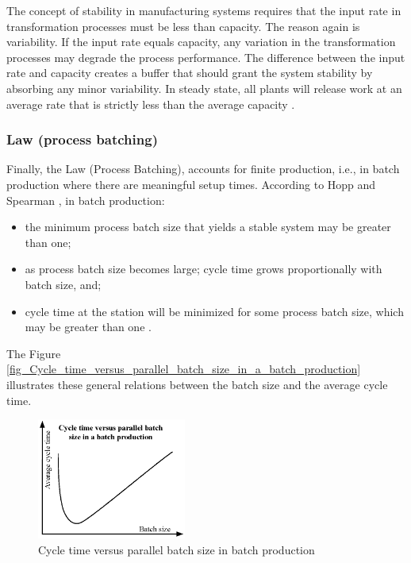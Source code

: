 \documentclass{article}
\begin{document}
The concept of stability in manufacturing systems requires that the input rate in transformation processes must be less than capacity.
The reason again is variability.
If the input rate equals capacity, any variation in the transformation processes may degrade the process performance.
The difference between the input rate and capacity creates a buffer that should grant the system stability by absorbing any minor variability.
In steady state, all plants will release work at an average rate that is strictly less than the average capacity \citep{Hopp2001}.

\subsubsection{Law (process batching)}
\label{sec:org65cbaca}

Finally, the Law (Process Batching), accounts for finite production, i.e., in batch production where there are meaningful setup times.
According to Hopp and Spearman \cite{Hopp2001}, in batch production:

\begin{itemize}
    \item the minimum process batch size that yields a stable system may be greater than one;
    \item as process batch size becomes large; cycle time grows proportionally with batch size, and;
    \item cycle time at the station will be minimized for some process batch size, which may be greater than one \citep[p.306]{Hopp2001}.
\end{itemize}

The Figure \ref{fig_Cycle_time_versus_parallel_batch_size_in_a_batch_production} illustrates these general relations between the batch size and the average cycle time.

\begin{figure}[htbp]
\centering
\includegraphics[height=150]{Figures/Cycle_time_versus_parallel_batch_size_in_a_batch_production.eps}
\caption{\label{fig:org0e9c46a}Cycle time versus parallel batch size in batch production}
\end{figure}
\end{document}

